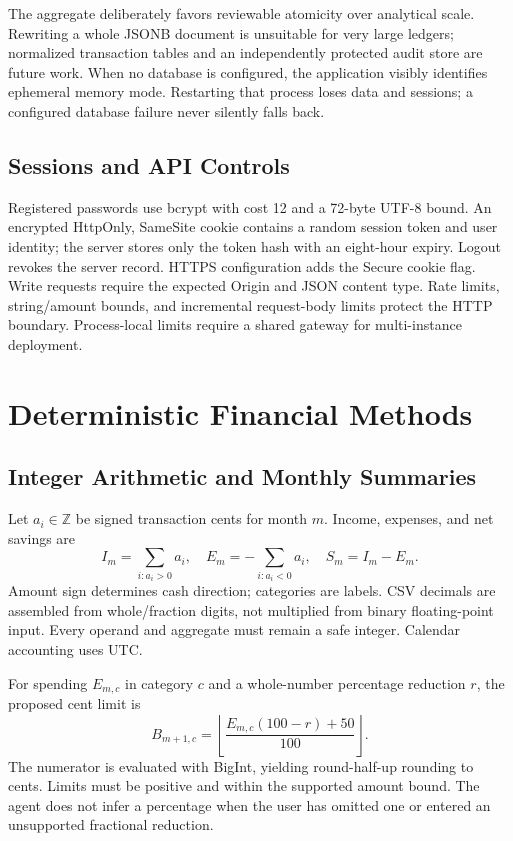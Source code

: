\documentclass[conference,a4paper]{IEEEtran}
\begin{document}
The aggregate deliberately favors reviewable atomicity over analytical scale. Rewriting a whole JSONB document is unsuitable for very large ledgers; normalized transaction tables and an independently protected audit store are future work. When no database is configured, the application visibly identifies ephemeral memory mode. Restarting that process loses data and sessions; a configured database failure never silently falls back.

\subsection{Sessions and API Controls}
Registered passwords use bcrypt with cost 12 and a 72-byte UTF-8 bound. An encrypted HttpOnly, SameSite cookie contains a random session token and user identity; the server stores only the token hash with an eight-hour expiry. Logout revokes the server record. HTTPS configuration adds the Secure cookie flag. Write requests require the expected Origin and JSON content type. Rate limits, string/amount bounds, and incremental request-body limits protect the HTTP boundary. Process-local limits require a shared gateway for multi-instance deployment.

\section{Deterministic Financial Methods}
\subsection{Integer Arithmetic and Monthly Summaries}
Let $a_i\in\mathbb{Z}$ be signed transaction cents for month $m$. Income, expenses, and net savings are
\begin{equation}
I_m=\sum_{i:a_i>0}a_i,\quad E_m=-\sum_{i:a_i<0}a_i,\quad S_m=I_m-E_m.
\end{equation}
Amount sign determines cash direction; categories are labels. CSV decimals are assembled from whole/fraction digits, not multiplied from binary floating-point input. Every operand and aggregate must remain a safe integer. Calendar accounting uses UTC.

For spending $E_{m,c}$ in category $c$ and a whole-number percentage reduction $r$, the proposed cent limit is
\begin{equation}
B_{m+1,c}=\left\lfloor\frac{E_{m,c}(100-r)+50}{100}\right\rfloor .
\label{eq:budget}
\end{equation}
The numerator is evaluated with BigInt, yielding round-half-up rounding to cents. Limits must be positive and within the supported amount bound. The agent does not infer a percentage when the user has omitted one or entered an unsupported fractional reduction.
\end{document}
